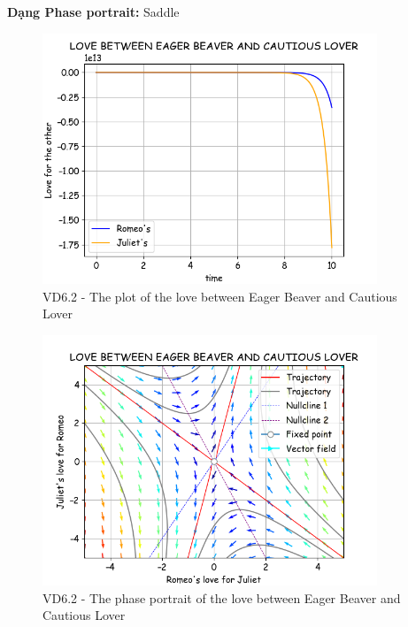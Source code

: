 \textbf{Dạng Phase portrait: } Saddle
\pagebreak
\begin{figure}[!htbp]
    \centering
    \includegraphics[width=100mm]{image/bt2/plot6.2.png}
    \caption{VD6.2 - The plot of the love between Eager Beaver and Cautious Lover}
\end{figure}
\begin{figure}[!htbp]
    \centering
    \includegraphics[width=100mm]{image/bt2/pp6.2.png}
    \caption{VD6.2 - The phase portrait of the love between Eager Beaver and Cautious Lover}
\end{figure}

